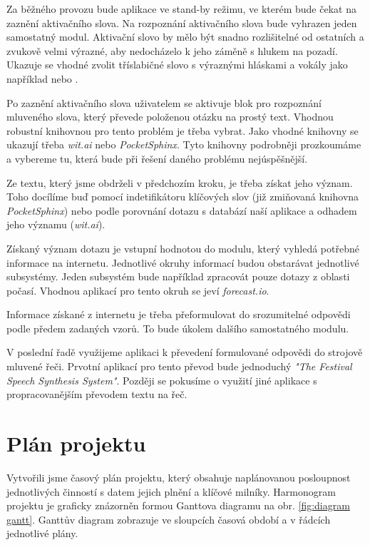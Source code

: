 \documentclass[12pt,a4paper]{article}
\begin{document}
Za běžného provozu bude aplikace ve stand-by režimu, ve kterém bude čekat na zaznění aktivačního slova. Na rozpoznání aktivačního slova bude vyhrazen jeden samostatný modul. Aktivační slovo by mělo být snadno rozlišitelné od ostatních a zvukově velmi výrazné, aby nedocházelo k jeho záměně s hlukem na pozadí. Ukazuje se vhodné zvolit tříslabičné slovo s výraznými hláskami a vokály jako například  nebo .

Po zaznění aktivačního slova uživatelem se aktivuje blok pro rozpoznání mluveného slova, který převede položenou otázku na prostý text. Vhodnou robustní knihovnou pro tento problém je třeba vybrat. Jako vhodné knihovny se ukazují třeba \textit{wit.ai} nebo \textit{PocketSphinx}. Tyto knihovny podrobněji prozkoumáme a vybereme tu, která bude při řešení daného problému nejúspěšnější.

Ze textu, který jsme obdrželi v předchozím kroku, je třeba získat jeho význam. Toho docílíme buď pomocí indetifikátoru klíčových slov (již zmiňovaná knihovna \textit{PocketSphinx}) nebo podle porovnání dotazu s databází naší aplikace a odhadem jeho významu (\textit{wit.ai}).

Získaný význam dotazu je vstupní hodnotou do modulu, který vyhledá potřebné informace na internetu. Jednotlivé okruhy informací budou obstarávat jednotlivé subsystémy. Jeden subsystém bude například zpracovát pouze dotazy z oblasti počasí. Vhodnou aplikací pro tento okruh se jeví \textit{forecast.io}.

Informace získané z internetu je třeba přeformulovat do srozumitelné odpovědi podle předem zadaných vzorů. To bude úkolem dalšího samostatného modulu.

V poslední řadě využijeme aplikaci k převedení formulované odpovědi do strojově mluvené řeči. Prvotní aplikací pro tento převod bude jednoduchý \textit{"The Festival Speech Synthesis System"}. Později se pokusíme o využití jiné aplikace s propracovanějším převodem textu na řeč.


\section*{Plán projektu}
Vytvořili jsme časový plán projektu, který obsahuje naplánovanou posloupnost jednotlivých činností s datem jejich plnění a klíčové milníky. Harmonogram projektu je graficky znázorněn formou Ganttova diagramu na obr. \ref{fig:diagram gantt}. Ganttův diagram zobrazuje ve sloupcích časová období a v řádcích jednotlivé plány.
\end{document}
